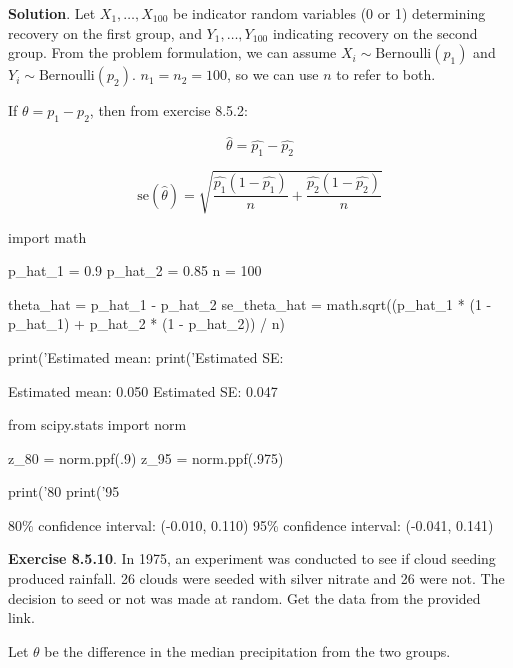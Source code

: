 \textbf{Solution}. Let \(X_1, \dots, X_100\) be indicator random
variables (0 or 1) determining recovery on the first group, and
\(Y_1, \dots, Y_100\) indicating recovery on the second group. From the
problem formulation, we can assume \(X_i \sim \text{Bernoulli}(p_1)\)
and \(Y_i \sim \text{Bernoulli}(p_2)\). \(n_1 = n_2 = 100\), so we can
use \(n\) to refer to both.

If \(\theta = p_1 - p_2\), then from exercise 8.5.2:

\[\hat{\theta} = \hat{p_1} - \hat{p_2}\]

\[\text{se}(\hat{\theta}) = \sqrt{\frac{\hat{p_1}(1 - \hat{p_1})}{n} + \frac{\hat{p_2}(1 - \hat{p_2})}{n}}\]

\begin{python}
import math

p_hat_1 = 0.9
p_hat_2 = 0.85
n = 100

theta_hat = p_hat_1 - p_hat_2
se_theta_hat = math.sqrt((p_hat_1 * (1 - p_hat_1) + p_hat_2 * (1 - p_hat_2)) / n)

print('Estimated mean: %
print('Estimated SE: %
\end{python}

\begin{console}
Estimated mean: 0.050
Estimated SE: 0.047
\end{console}

\begin{python}
from scipy.stats import norm

z_80 = norm.ppf(.9)
z_95 = norm.ppf(.975)

print('80%
print('95%
\end{python}

\begin{console}
80\% confidence interval: (-0.010, 0.110)
95\% confidence interval: (-0.041, 0.141)
\end{console}

\textbf{Exercise 8.5.10}. In 1975, an experiment was conducted to see if
cloud seeding produced rainfall. 26 clouds were seeded with silver
nitrate and 26 were not. The decision to seed or not was made at random.
Get the data from the provided link.

Let \(\theta\) be the difference in the median precipitation from the
two groups.

